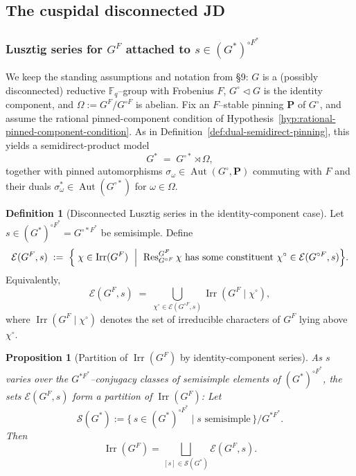 \documentclass{amsart}
\theoremstyle{plain}
\numberwithin{equation}{section}
\newtheorem{proposition}[theorem]{Proposition}
\theoremstyle{definition}
\newtheorem{definition}[theorem]{Definition}
\newcommand{\cE}{\mathcal{E}}
\newcommand{\Res}{\operatorname{Res}}
\newcommand{\Irr}{\operatorname{Irr}}
\newcommand{\Aut}{\operatorname{Aut}}
\newcommand{\F}{\mathbb{F}}
\begin{document}
\subsection{The cuspidal disconnected JD}
\subsubsection{Lusztig series for $G^F$ attached to $s\in (G^*)^{\circ F^*}$}
\label{subsubsec:disc-Lusztig-series}

We keep the standing assumptions and notation from \S9: $G$ is a (possibly disconnected) reductive
$\F_q$--group with Frobenius $F$, $G^\circ\lhd G$ is the identity component, and $\Omega:=G^F/G^{\circ F}$
is abelian. Fix an $F$--stable pinning $\mathbf P$ of $G^\circ$, and assume the rational
pinned-component condition of Hypothesis~\ref{hyp:rational-pinned-component-condition}.  As in Definition~\ref{def:dual-semidirect-pinning}, this yields a semidirect-product model
\[
G^* \;=\; G^{\circ *}\rtimes \Omega,
\]
together with pinned automorphisms $\sigma_\omega\in \Aut(G^\circ,\mathbf P)$ commuting with $F$ and their
duals $\sigma_\omega^*\in \Aut(G^{\circ *})$ for $\omega\in \Omega$.

\begin{definition}[Disconnected Lusztig series in the identity-component case]
\label{def:disc-Lusztig-series}
Let $s\in (G^*)^{\circ F^*}=G^{\circ *F^*}$ be semisimple. Define
\[
\cE(G^F,s)\;:=\;\Bigl\{\;\chi\in \Irr(G^F)\ \Bigm|\
\Res^{G^F}_{G^{\circ F}}\chi\ \text{has some constituent }\chi^\circ\in \cE(G^{\circ F},s)\Bigr\}.
\]
Equivalently,
\[
\cE(G^F,s)\;=\;\bigcup_{\chi^\circ\in \cE(G^{\circ F},s)} \Irr(G^F\mid \chi^\circ),
\]
where $\Irr(G^F\mid \chi^\circ)$ denotes the set of irreducible characters of $G^F$ lying above $\chi^\circ$.
\end{definition}

\begin{proposition}[Partition of $\Irr(G^F)$ by identity-component series]
\label{prop:disc-series-partition}
As $s$ varies over the $G^{*F^*}$--conjugacy classes of semisimple elements of $(G^*)^{\circ F^*}$, the sets
$\cE(G^F,s)$ form a partition of $\Irr(G^F)$:
Let
\[
\mathcal S(G^*)
:=
\{\, s\in (G^*)^{\circ F^*}\mid s \text{ semisimple}\,\}/G^{*F^*}.
\]
Then
\[
\Irr(G^F)
=
\bigsqcup_{[s]\in \mathcal S(G^*)}
\cE(G^F,s).
\]

\end{proposition}
\end{document}
